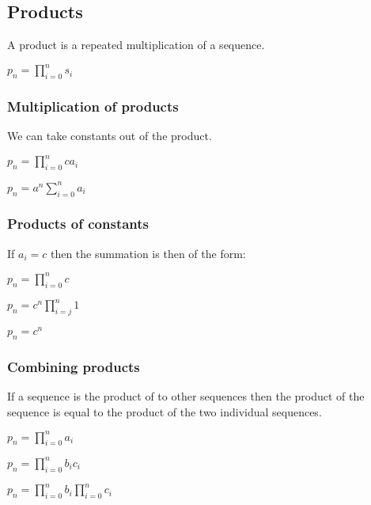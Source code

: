 
\subsection{Products}


A product is a repeated multiplication of a sequence.

\(p_n=\prod_{i=0}^ns_i\)

\subsubsection{Multiplication of products}

We can take constants out of the product.

\(p_n=\prod_{i=0}^nca_i\)

\(p_n=a^{n}\sum_{i=0}^na_i\)

\subsubsection{Products of constants}

If \(a_i=c\) then the summation is then of the form:

\(p_n=\prod_{i=0}^nc\)

\(p_n=c^{n}\prod_{i=j}^n1\)

\(p_n=c^{n}\)

\subsubsection{Combining products}

If a sequence is the product of to other sequences then the product of the sequence is equal to the product of the two individual sequences.

\(p_n=\prod_{i=0}^na_i\)

\(p_n=\prod_{i=0}^nb_ic_i\)

\(p_n=\prod_{i=0}^nb_i\prod_{i=0}^nc_i\)

